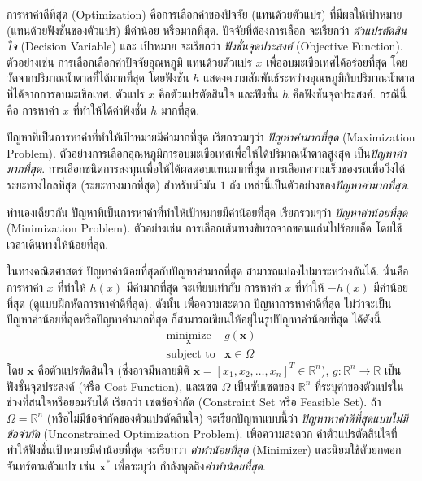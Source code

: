 การหาค่าดีที่สุด (Optimization) คือการเลือกค่าของปัจจัย (แทนด้วยตัวแปร) ที่มีผลให้เป้าหมาย (แทนด้วยฟังชั่นของตัวแปร) มีค่าน้อย หรือมากที่สุด.
ปัจจัยที่ต้องการเลือก จะเรียกว่า \textit{ตัวแปรตัดสินใจ} (Decision Variable) และ
เป้าหมาย จะเรียกว่า \textit{ฟังชั่นจุดประสงค์} (Objective Function).
%
ตัวอย่างเช่น การเลือกเลือกค่าปัจจัยอุณหภูมิ แทนด้วยตัวแปร $x$ เพื่ออบมะเขือเทศได้อร่อยที่สุด โดยวัดจากปริมาณน้ำตาลที่ได้มากที่สุด โดยฟังชั่น $h$ แสดงความสัมพันธ์ระหว่างอุณหภูมิกับปริมาณน้ำตาลที่ได้จากการอบมะเขือเทศ.
ตัวแปร $x$ คือตัวแปรตัดสินใจ และฟังชั่น $h$ คือฟังชั่นจุดประสงค์.
กรณีนี้คือ การหาค่า $x$ ที่ทำให้ได้ค่าฟังชั่น $h$ มากที่สุด.

ปัญหาที่เป็นการหาค่าที่ทำให้เป้าหมายมีค่ามากที่สุด เรียกรวมๆว่า \textit{ปัญหาค่ามากที่สุด} (Maximization Problem).
ตัวอย่างการเลือกอุณหภูมิการอบมะเขือเทศเพื่อให้ได้ปริมาณน้ำตาลสูงสุด เป็น\textit{ปัญหาค่ามากที่สุด}.
การเลือกชนิดการลงทุนเพื่อให้ได้ผลตอบแทนมากที่สุด 
การเลือกความเร็วของรถเพื่อวิ่งได้ระยะทางไกลที่สุด (ระยะทางมากที่สุด) สำหรับนำ้มัน $1$ ถัง 
เหล่านี้เป็นตัวอย่างของ\textit{ปัญหาค่ามากที่สุด}.

ทำนองเดียวกัน ปัญหาที่เป็นการหาค่าที่ทำให้เป้าหมายมีค่าน้อยที่สุด เรียกรวมๆว่า \textit{ปัญหาค่าน้อยที่สุด} (Minimization Problem).
ตัวอย่างเช่น การเลือกเส้นทางขับรถจากขอนแก่นไปร้อยเอ็ด โดยใช้เวลาเดินทางให้น้อยที่สุด.

ในทางคณิตศาสตร์ ปัญหาค่าน้อยที่สุดกับปัญหาค่ามากที่สุด สามารถแปลงไปมาระหว่างกันได้.
นั่นคือ การหาค่า $x$ ที่ทำให้ $h(x)$ มีค่ามากที่สุด 
จะเทียบเท่ากับ การหาค่า $x$ ที่ทำให้ $-h(x)$ มีค่าน้อยที่สุด (ดูแบบฝึกหัดการหาค่าดีที่สุด).
ดังนั้น เพื่อความสะดวก ปัญหาการหาค่าดีที่สุด ไม่ว่าจะเป็นปัญหาค่าน้อยที่สุดหรือปัญหาค่ามากที่สุด ก็สามารถเขียนให้อยู่ในรูปปัญหาค่าน้อยที่สุด ได้ดังนี้
\begin{eqnarray}
   \underset{\mathbf{x}}{\mbox{minimize}} & g(\mathbf{x})
\nonumber \\
   \mbox{subject to} & \mathbf{x} \in \Omega
\end{eqnarray}
โดย $\mathbf{x}$ คือตัวแปรตัดสินใจ (ซึ่งอาจมีหลายมิติ $\mathbf{x} = [x_1, x_2, \ldots, x_n]^T \in \mathbb{R}^n$),
$g: \mathbb{R}^n \to \mathbb{R}$ เป็นฟังชั่นจุดประสงค์ (หรือ Cost Function),
และเซต $\Omega$ เป็นซับเซตของ $\mathbb{R}^n$ ที่ระบุค่าของตัวแปรในช่วงที่สนใจหรือยอมรับได้ เรียกว่า เซตข้อจำกัด (Constraint Set หรือ Feasible Set).
ถ้า $\Omega = \mathbb{R}^n$ (หรือไม่มีข้อจำกัดของตัวแปรตัดสินใจ) จะเรียกปัญหาแบบนี้ว่า \textit{ปัญหาหาค่าดีที่สุดแบบไม่มีข้อจำกัด} (Unconstrained Optimization Problem).
เพื่อความสะดวก ค่าตัวแปรตัดสินใจที่ทำให้ฟังชั่นเป้าหมายมีค่าน้อยที่สุด จะเรียกว่า \textit{ค่าทำน้อยที่สุด} (Minimizer) และนิยมใช้ตัวยกดอกจันทร์ตามตัวแปร เช่น $\mathbf{x}^*$ เพื่อระบุว่า กำลังพูดถึง\textit{ค่าทำน้อยที่สุด}.

